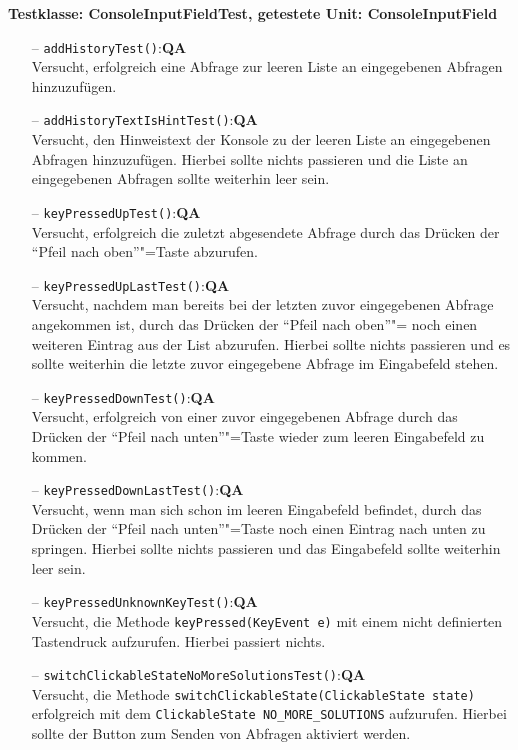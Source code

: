 \documentclass[parskip=full,11pt,twoside]{scrartcl}
\def\qa{\hfill\textbf{QA}}
\begin{document}
\textbf{Testklasse: ConsoleInputFieldTest, getestete Unit: ConsoleInputField}
\begin{itemize}
	\item[--] \texttt{addHistoryTest()}:\qa\\
	Versucht, erfolgreich eine Abfrage zur leeren Liste an eingegebenen Abfragen hinzuzufügen.
	\item[--] \texttt{addHistoryTextIsHintTest()}:\qa\\
	Versucht, den Hinweistext der Konsole zu der leeren Liste an eingegebenen Abfragen hinzuzufügen. Hierbei sollte nichts passieren und die Liste an eingegebenen Abfragen sollte weiterhin leer sein.
	\item[--] \texttt{keyPressedUpTest()}:\qa\\
	Versucht, erfolgreich die zuletzt abgesendete Abfrage durch das Drücken der \enquote{Pfeil nach oben}"=Taste abzurufen.
	\item[--] \texttt{keyPressedUpLastTest()}:\qa\\
	Versucht, nachdem man bereits bei der letzten zuvor eingegebenen Abfrage angekommen ist, durch das Drücken der \enquote{Pfeil nach oben}"= noch einen weiteren Eintrag aus der List abzurufen. Hierbei sollte nichts passieren und es sollte weiterhin die letzte zuvor eingegebene Abfrage im Eingabefeld stehen.
	\item[--] \texttt{keyPressedDownTest()}:\qa\\
	Versucht, erfolgreich von einer zuvor eingegebenen Abfrage durch das Drücken der \enquote{Pfeil nach unten}"=Taste wieder zum leeren Eingabefeld zu kommen.
	\item[--] \texttt{keyPressedDownLastTest()}:\qa\\
	Versucht, wenn man sich schon im leeren Eingabefeld befindet, durch das Drücken der \enquote{Pfeil nach unten}"=Taste noch einen Eintrag nach unten zu springen. Hierbei sollte nichts passieren und das Eingabefeld sollte weiterhin leer sein.
	\item[--] \texttt{keyPressedUnknownKeyTest()}:\qa\\
	Versucht, die Methode \texttt{keyPressed(KeyEvent e)} mit einem nicht definierten Tastendruck aufzurufen. Hierbei passiert nichts.
	\item[--] \texttt{switchClickableStateNoMoreSolutionsTest()}:\qa\\
	Versucht, die Methode \texttt{switchClickableState(ClickableState state)} erfolgreich mit dem \texttt{ClickableState NO\_MORE\_SOLUTIONS} aufzurufen. Hierbei sollte der Button zum Senden von Abfragen aktiviert werden.

\end{itemize}
\end{document}
